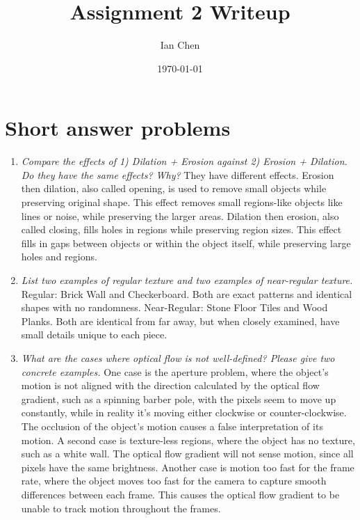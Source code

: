 \documentclass[11pt]{article}
\title{Assignment 2 Writeup}
\author{Ian Chen}
\date{\today}
\begin{document}
    \maketitle


    \section{Short answer problems}

    \begin{enumerate}
        \item \textit{Compare the effects of 1) Dilation + Erosion against 2) Erosion + Dilation. Do they have the same
        effects? Why?}\newline
        They have different effects. Erosion then dilation, also called opening, is used to
        remove small objects while preserving original shape. This effect removes small regions-like objects like lines
        or noise, while preserving the larger areas. Dilation then erosion, also called closing, fills holes in regions
        while preserving region sizes. This effect fills in gaps between objects or within the object itself, while
        preserving large holes and regions.\newline

        \item \textit{List two examples of regular texture and two examples of near-regular texture.}\newline
        Regular: Brick Wall and Checkerboard. Both are exact patterns and identical shapes with no randomness.\newline
        Near-Regular: Stone Floor Tiles and Wood Planks. Both are identical from far away, but when closely examined,
        have
        small details unique to each piece.\newline

        \item \textit{What are the cases where optical flow is not well-defined? Please give two concrete examples.}\newline
        One case is the aperture problem, where the object's motion is not aligned with the direction calculated by the
        optical flow gradient, such as a spinning barber pole, with the pixels seem to move up constantly, while in
        reality it's moving either clockwise or counter-clockwise. The occlusion of the object's motion causes a false
        interpretation of its motion.\newline
        A second case is texture-less regions, where the object has no texture, such as a white wall. The optical flow
        gradient will not sense motion, since all pixels have the same brightness.\newline
        Another case is motion too fast for the frame rate, where the object moves too fast for the camera to capture
        smooth differences between each frame. This causes the optical flow gradient to be unable to track motion
        throughout the frames.\newline


\end{enumerate}
\end{document}
